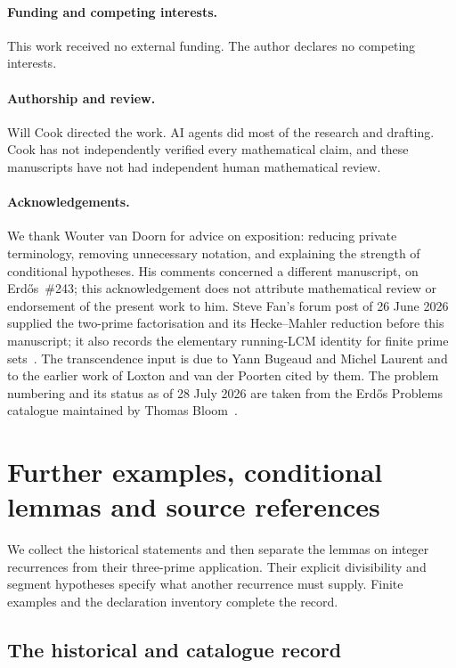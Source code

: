 \documentclass[11pt]{article}
\theoremstyle{remark}
\theoremstyle{plain}
\begin{document}
\paragraph{Funding and competing interests.} This work received no external
funding.  The author declares no competing interests.

\paragraph{Authorship and review.} Will Cook directed the work.  AI agents
did most of the research and drafting.  Cook has not independently
verified every mathematical claim, and these manuscripts have not had
independent human mathematical review.

\paragraph{Acknowledgements.} We thank Wouter van Doorn for advice on
exposition: reducing private terminology, removing unnecessary notation,
and explaining the strength of conditional hypotheses.  His comments
concerned a different manuscript, on Erd\H{o}s~\#243; this acknowledgement
does not attribute mathematical review or endorsement of the present
work to him.  Steve Fan's forum post of 26 June 2026 supplied the
two-prime factorisation and its Hecke--Mahler reduction before this
manuscript; it also records the elementary running-LCM identity for finite
prime sets~\cite{fan2026comment}.  The
transcendence input is due to Yann Bugeaud and Michel Laurent and to the
earlier work of Loxton and van der Poorten cited by them.  The
problem numbering and its status as of 28 July 2026 are taken from the
Erd\H{o}s Problems catalogue maintained by Thomas Bloom~\cite{erdosproblems}.
\section{Further examples, conditional lemmas and source references}
\label{long269:long:extended}

We collect the historical statements and then separate the lemmas on integer recurrences
from their three-prime application. Their explicit divisibility and
segment hypotheses specify what another recurrence must supply. Finite
examples and the declaration inventory complete the record.

\subsection{The historical and catalogue record}\label{long269:long:history}
\end{document}
